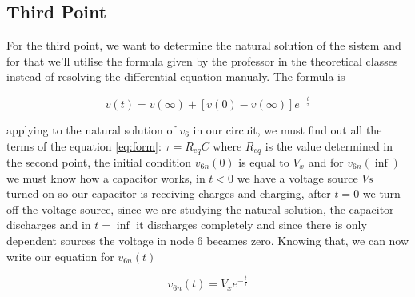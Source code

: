 \vspace{5mm}
\begin{table}[h!]
\centering
\begin{tabularx}{0.6\textwidth} {
  | >{\raggedright\arraybackslash}X
  | >{\raggedleft\arraybackslash}X | }
 \hline

\end{tabularx}
\end{table}

\vspace{5mm}
\begin{table}[h!]
\centering
\begin{tabularx}{0.6\textwidth} {
  | >{\raggedright\arraybackslash}X
  | >{\raggedleft\arraybackslash}X | }
 \hline

\end{tabularx}
\end{table}
\vspace{5mm}


\subsection{Third Point}
\label{ssec:3T}

\noindent \par For the third point, we want to determine the natural solution of the sistem and for that we'll utilise the formula given by the professor in the theoretical classes instead of resolving the differential equation manualy. The formula is 

\begin{equation}
  v(t) = v(\infty) + [v(0) - v(\infty)]e^{-\frac{t}{\tau}}
  \label{eq:form}
\end{equation}

applying to the natural solution of $v_6$ in our circuit, we must find out all the terms of the equation \ref{eq:form}: $\tau=R_{eq}C$ where $R_{eq}$ is the value determined in the second point, the initial condition $v_{6n}(0)$ is equal to $V_x$ and for $v_{6n}(\inf)$ we must know how a capacitor works, in $t<0$ we have a voltage source $Vs$ turned on so our capacitor is receiving charges and charging, after $t=0$ we turn off the voltage source, since we are studying the natural solution, the capacitor discharges and in $t=\inf$ it discharges completely and since there is only dependent sources the voltage in node 6 becames zero. Knowing that, we can now write our equation for $v_{6n}(t)$

\begin{equation}
  v_{6n}(t) = V_x e^{-\frac{t}{\tau}}
  \label{eq:snat}
\end{equation}

